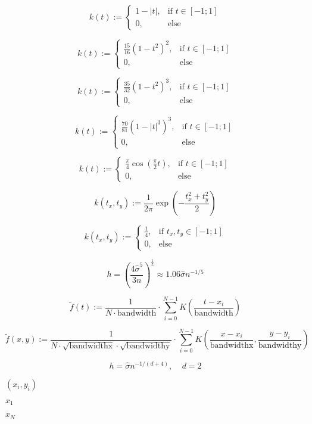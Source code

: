 \documentclass{article}
\begin{document}
\[ k(t) :=\begin{cases}1-|t|, & \text{if }t\in [-1;1]\\0, & \text{else}\end{cases} \]
\pagebreak

\[ k(t) :=\begin{cases}\frac{15}{16}(1-t^2)^2, & \text{if }t\in [-1;1]\\0, & \text{else}\end{cases} \]
\pagebreak

\[ k(t) :=\begin{cases}\frac{35}{32}(1-t^2)^3, & \text{if }t\in [-1;1]\\0, & \text{else}\end{cases} \]
\pagebreak

\[ k(t) :=\begin{cases}\frac{70}{81}(1-|t|^3)^3, & \text{if }t\in [-1;1]\\0, & \text{else}\end{cases} \]
\pagebreak

\[ k(t) :=\begin{cases}\frac{\pi}{4}\cos\left(\frac{\pi}{2}t\right), & \text{if }t\in [-1;1]\\0, & \text{else}\end{cases} \]
\pagebreak

\[ k(t_x, t_y):=\frac{1}{2\pi}\exp \left(-\frac{t_x^2+t_y^2}{2}\right) \]
\pagebreak

\[ k(t_x, t_y):=\begin{cases}\frac{1}{4}, & \text{if }t_x,t_y\in [-1;1]\\0, & \text{else}\end{cases} \]
\pagebreak

\[ h = \left(\frac{4\hat{\sigma}^5}{3n}\right)^{\frac{1}{5}} \approx 1.06 \hat{\sigma} n^{-1/5} \]
\pagebreak

\[ \tilde{f}(t):=\frac{1}{N\cdot\text{bandwidth}}\cdot\sum\limits_{i=0}^{N-1}K\left(\frac{t-x_i}{\text{bandwidth}}\right) \]
\pagebreak

\[ \tilde{f}(x,y):=\frac{1}{N\cdot\sqrt{\text{bandwidthx}}\cdot\sqrt{\text{bandwidthy}}}\cdot\sum\limits_{i=0}^{N-1}K\left(\frac{x-x_i}{\text{bandwidthx}},\frac{y-y_i}{\text{bandwidthy}}\right) \]
\pagebreak

\[ h = \hat{\sigma} n^{-1/(d+4)},\ \ \ \ \ d=2 \]
\pagebreak

$ (x_i,y_i) $
\pagebreak

$ x_1 $
\pagebreak

$ x_N $
\pagebreak
\end{document}
